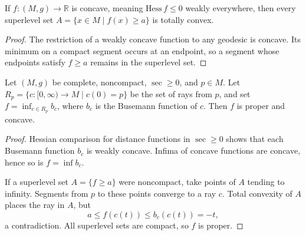 \begin{lemma}
  \label{lem:pet-ch12-concave-superlevel-convex}
  If $f:(M,g)\to\mathbb{R}$ is concave, meaning $\mathrm{Hess}\,f\le0$ weakly
  everywhere, then every superlevel set $A=\{x\in M\mid f(x)\ge a\}$ is totally
  convex.
\end{lemma}
\begin{proof}
  \sketch
  The restriction of a weakly concave function to any geodesic is concave.
  Its minimum on a compact segment occurs at an endpoint, so a segment whose
  endpoints satisfy \(f\ge a\) remains in the superlevel set.
\end{proof}

\begin{lemma}
  \label{lem:pet-ch12-busemann-proper-concave}
  Let $(M,g)$ be complete, noncompact, $\sec\ge0$, and $p\in M$. Let
  $R_p=\{c:[0,\infty)\to M\mid c(0)=p\}$ be the set of rays from $p$, and set
  $f=\inf_{c\in R_p}b_c$, where $b_c$ is the Busemann function of $c$. Then $f$
  is proper and concave.
\end{lemma}
\begin{proof}
  \sketch
  Hessian comparison for distance functions in \(\sec\ge0\) shows that each
  Busemann function \(b_c\) is weakly concave. Infima of concave functions are
  concave, hence so is \(f=\inf b_c\).

  If a superlevel set \(A=\{f\ge a\}\) were noncompact, take points of \(A\)
  tending to infinity. Segments from \(p\) to these points converge to a ray
  \(c\). Total convexity of \(A\) places the ray in \(A\), but
  \[ a\le f(c(t))\le b_c(c(t))=-t, \]
  a contradiction. All superlevel sets are compact, so \(f\) is proper.
\end{proof}

